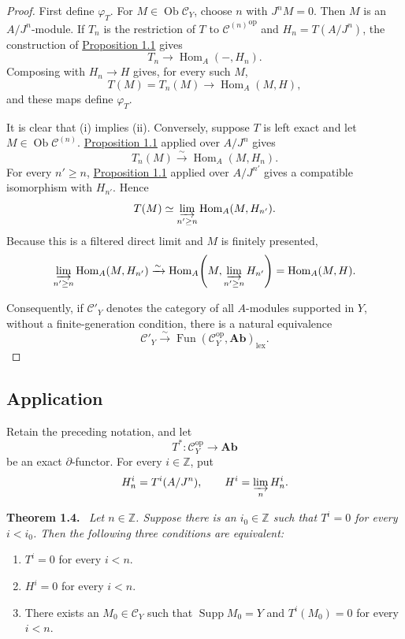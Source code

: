 \documentclass[11pt,a4paper,oneside]{book}
\providecommand{\srcpage}[1]{%
  \marginpar{\raggedright\scriptsize\color{gray}Original French p.~#1}}
\providecommand{\Ab}{\mathbf{Ab}}
\providecommand{\Ccat}{\mathcal C}
\providecommand{\Supp}{\operatorname{Supp}}
\providecommand{\Homop}{\operatorname{Hom}}
\providecommand{\Ob}{\operatorname{Ob}}
\newenvironment{sgastatement}[1]
  {\par\addvspace{0.8\baselineskip}\noindent\textbf{#1.}\ \itshape}
  {\par\addvspace{0.35\baselineskip}}
\theoremstyle{plain}
\theoremstyle{definition}
\theoremstyle{remark}
\begin{document}
\begin{proof}
First define $\varphi_T$. For $M\in\Ob\Ccat_Y$, choose $n$ with $J^nM=0$.
Then $M$ is an $A/J^n$-module. If $T_n$ is the restriction of $T$ to
${\Ccat^{(n)}}^{\mathrm{op}}$ and $H_n=T(A/J^n)$, the construction of
\hyperref[IV.1.1]{Proposition 1.1} gives
\[
  T_n\longrightarrow\Homop_A(-,H_n).
\]
Composing with $H_n\to H$ gives, for every such $M$,
\[
  T(M)=T_n(M)\longrightarrow\Homop_A(M,H),
\]
and these maps define $\varphi_T$.

It is clear that (i) implies (ii). Conversely, suppose $T$ is left exact and
let $M\in\Ob\Ccat^{(n)}$. \hyperref[IV.1.1]{Proposition 1.1} applied over $A/J^n$ gives
\[
  T_n(M)\xrightarrow{\sim}\Homop_A(M,H_n).
\]
For every $n'\ge n$, \hyperref[IV.1.1]{Proposition 1.1} applied over $A/J^{n'}$ gives a
compatible isomorphism with $H_{n'}$. Hence
\[
  T(M)\simeq\varinjlim_{n'\ge n}\Homop_A(M,H_{n'}).
\]
Because this is a filtered direct limit and $M$ is finitely presented,
\[
  \varinjlim_{n'\ge n}\Homop_A(M,H_{n'})
  \xrightarrow{\sim}
  \Homop_A\!\left(M,\varinjlim_{n'\ge n}H_{n'}\right)
  =\Homop_A(M,H).
\]

Consequently, if $\Ccat'_Y$ denotes the category of all $A$-modules supported
in $Y$, without a finite-generation condition, there is a natural equivalence
\[
  \Ccat'_Y\xrightarrow{\sim}
  \operatorname{Fun}(\Ccat_Y^{\mathrm{op}},\Ab)_{\mathrm{lex}}.
\]
\end{proof}

\subsection*{Application}

Retain the preceding notation, and let\srcpage{46}
\[
  T^*:\Ccat_Y^{\mathrm{op}}\longrightarrow\Ab
\]
be an exact $\partial$-functor. For every $i\in\mathbb Z$, put
\[
  H_n^i=T^i(A/J^n),\qquad H^i=\varinjlim_n H_n^i.
\]

\begin{sgastatement}{Theorem 1.4}
Let $n\in\mathbb Z$. Suppose there is an $i_0\in\mathbb Z$ such that
$T^i=0$ for every $i<i_0$. Then the following three conditions are equivalent:
\begin{enumerate}[label=\textup{\roman*)},leftmargin=2.7em]
\item $T^i=0$ for every $i<n$.
\item $H^i=0$ for every $i<n$.
\item There exists an $M_0\in\Ccat_Y$ such that $\Supp M_0=Y$ and
$T^i(M_0)=0$ for every $i<n$.
\end{enumerate}
\end{sgastatement}
\end{document}
